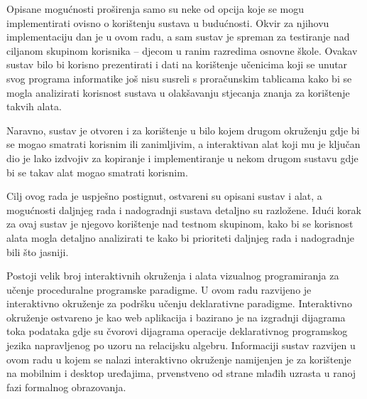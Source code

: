 \documentclass[times, utf8, diplomski, numeric]{fer}
\newcommand{\razmakp}{\vspace{18pt}}
\begin{document}
\razmakp

Opisane mogućnosti proširenja samo su neke od opcija koje se mogu implementirati ovisno o korištenju sustava u budućnosti.
Okvir za njihovu implementaciju dan je u ovom radu, a sam sustav je spreman za testiranje nad ciljanom skupinom korisnika -- djecom u ranim razredima osnovne škole.
Ovakav sustav bilo bi korisno prezentirati i dati na korištenje učenicima koji se unutar svog programa informatike još nisu susreli s proračunskim tablicama kako bi se mogla analizirati korisnost sustava u olakšavanju stjecanja znanja za korištenje takvih alata.

Naravno, sustav je otvoren i za korištenje u bilo kojem drugom okruženju gdje bi se mogao smatrati korisnim ili zanimljivim, a interaktivan alat koji mu je ključan dio je lako izdvojiv za kopiranje i implementiranje u nekom drugom sustavu gdje bi se takav alat mogao smatrati korisnim.

\razmakp

Cilj ovog rada je uspješno postignut, ostvareni su opisani sustav i alat, a mogućnosti daljnjeg rada i nadogradnji sustava detaljno su razložene.
Idući korak za ovaj sustav je njegovo korištenje nad testnom skupinom, kako bi se korisnost alata mogla detaljno analizirati te kako bi prioriteti daljnjeg rada i nadogradnje bili što jasniji.







\begin{sazetak}
Postoji velik broj interaktivnih okruženja i alata vizualnog programiranja za učenje proceduralne programske paradigme.
U ovom radu razvijeno je interaktivno okruženje za podršku učenju deklarativne paradigme.
Interaktivno okruženje ostvareno je kao web aplikacija i bazirano je na izgradnji dijagrama toka podataka gdje su čvorovi dijagrama operacije deklarativnog programskog jezika napravljenog po uzoru na relacijsku algebru.
Informaciji sustav razvijen u ovom radu u kojem se nalazi interaktivno okruženje namijenjen je za korištenje na mobilnim i desktop uređajima, prvenstveno od strane mlađih uzrasta u ranoj fazi formalnog obrazovanja.


\end{sazetak}
\end{document}
